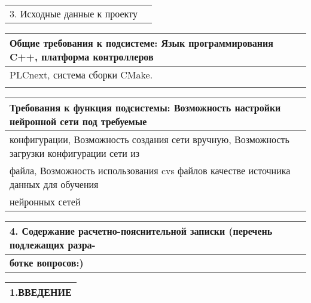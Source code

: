 \documentclass[12pt, А4, twoside]{article} %
\begin{document}
\begin{flushleft}
		\begin{tabular}{p{5.7cm} p{11.15cm}} 
			\textsf{3. Исходные данные к проекту} &
			\vspace{1pt} \\
		\end{tabular}   
		
		\begin{tabular}{p{17.25cm}}  
			\textsf{\textbf{Общие требования к подсистеме:}} \vspace{1pt} \textsf{Язык программирования C++, платформа контроллеров}\\ \hline 
			\textsf{PLCnext, система сборки CMake.} \vspace{1pt}\\ \hline 
			\vspace{1pt}\\ \hline
		\end{tabular}   
		
		\begin{tabular}{p{17.25cm}} 
			\textsf{\textbf{Требования к функция подсистемы:}} \vspace{1pt} \textsf{Возможность настройки нейронной сети под требуемые}\\ \hline 
			\textsf{ конфигурации, Возможность создания сети вручную, Возможность загрузки конфигурации сети из} \vspace{1pt}\\ \hline 
			\textsf{ файла, Возможность использования cvs файлов качестве источника данных для обучения} \vspace{1pt}\\ \hline 
			\textsf{ нейронных сетей} \vspace{1pt}\\ \hline 
		\end{tabular}   
		
		\begin{tabular}{p{17.25cm}}
			\textsf{\textbf{4. Содержание расчетно-пояснительной записки (перечень подлежащих разра-}} \vspace{1pt}\\ \hline 
			\textsf{\textbf{ботке вопросов:)}} \vspace{1pt}\\ \hline 
		\end{tabular} 
		
		\begin{tabular}{p{17.25cm}} 
			\textsf{1.ВВЕДЕНИЕ} \vspace{1pt}\\ \hline 
		\end{tabular} 
		

\end{flushleft}
\end{document}
